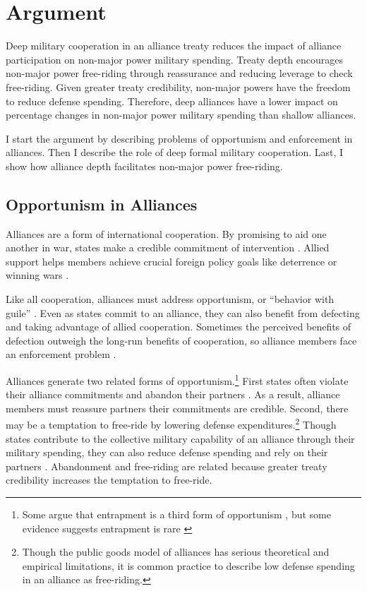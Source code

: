 \documentclass[12pt]{article}
\begin{document}
\section*{Argument}

Deep military cooperation in an alliance treaty reduces the impact of alliance participation on non-major power military spending.
Treaty depth encourages non-major power free-riding through reassurance and reducing leverage to check free-riding.  
Given greater treaty credibility, non-major powers have the freedom to reduce defense spending.
Therefore, deep alliances have a lower impact on percentage changes in non-major power military spending than shallow alliances. 


I start the argument by describing problems of opportunism and enforcement in alliances. 
Then I describe the role of deep formal military cooperation. 
Last, I show how alliance depth facilitates non-major power free-riding. 


\subsection*{Opportunism in Alliances}

Alliances are a form of international cooperation. 
By promising to aid one another in war, states make a credible commitment of intervention \citep{Fearon1997, Morrow2000}. 
Allied support helps members achieve crucial foreign policy goals like deterrence or winning wars \citep{Walt1990, Snyder1997}. 


Like all cooperation, alliances must address opportunism, or ``behavior with guile'' \citep{Williamson1985}. 
Even as states commit to an alliance, they can also benefit from defecting and taking advantage of allied cooperation. 
Sometimes the perceived benefits of defection outweigh the long-run benefits of cooperation, so alliance members face an enforcement problem \citep{Fearon1998a, Koremenosetal2001}.


Alliances generate two related forms of opportunism.\footnote{Some argue that entrapment is a third form of opportunism \citep{Snyder1984}, but some evidence suggests entrapment is rare \citep{Kim2011, Beckley2015}}
First states often violate their alliance commitments and abandon their partners \citep{BerkemeierFuhrmann2018}.
As a result, alliance members must reassure partners their commitments are credible. 
Second, there may be a temptation to free-ride by lowering defense expenditures.\footnote{Though the public goods model of alliances has serious theoretical and empirical limitations, it is common practice to describe low defense spending in an alliance as free-riding.}
Though states contribute to the collective military capability of an alliance through their military spending, they can also reduce defense spending and rely on their partners \citep{OlsonZeckhauser1966, Morrow1993, Conybeare1994, SandlerHartley2001}.
Abandonment and free-riding are related because greater treaty credibility increases the temptation to free-ride. 
\end{document}
